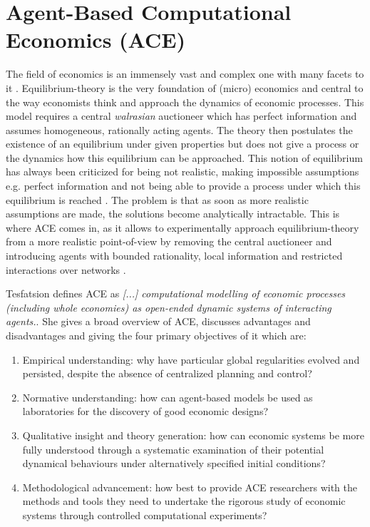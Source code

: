 \section{Agent-Based Computational Economics (ACE)}
The field of economics is an immensely vast and complex one with many facets to it \cite{bowles_understanding_2005}. Equilibrium-theory is the very foundation of (micro) economics \cite{colell_microeconomic_1995} and central to the way economists think and approach the dynamics of economic processes. This model requires a central \textit{walrasian} auctioneer which has perfect information and assumes homogeneous, rationally acting agents. The theory then postulates the existence of an equilibrium under given properties but does not give a process or the dynamics how this equilibrium can be approached. 
This notion of equilibrium has always been criticized for being not realistic, making impossible assumptions e.g. perfect information and not being able to provide a process under which this equilibrium is reached \cite{kirman_complex_2010}. The problem is that as soon as more realistic assumptions are made, the solutions become analytically intractable. This is where ACE comes in, as it allows to experimentally approach equilibrium-theory from a more realistic point-of-view by removing the central auctioneer and introducing agents with bounded rationality, local information and restricted interactions over networks \cite{farmer_economy_2009}. 

Tesfatsion \cite{tesfatsion_agent-based_2017} defines ACE as \textit{[...] computational modelling of economic processes (including whole economies) as open-ended dynamic systems of interacting agents.}. She gives a broad overview \cite{tesfatsion_agent-based_2006} of ACE, discusses advantages and disadvantages and giving the four primary objectives of it which are:

\begin{enumerate}
	\item Empirical understanding: why have particular global regularities evolved and persisted, despite the absence of centralized planning and control?
	\item Normative understanding: how can agent-based models be used as laboratories for the discovery of good economic designs?
	\item Qualitative insight and theory generation: how can economic systems be more fully understood through a systematic examination of their potential dynamical behaviours under alternatively specified initial conditions?
	\item Methodological advancement: how best to provide ACE researchers with the methods and tools they need to undertake the rigorous study of economic systems through controlled computational experiments?
\end{enumerate}

